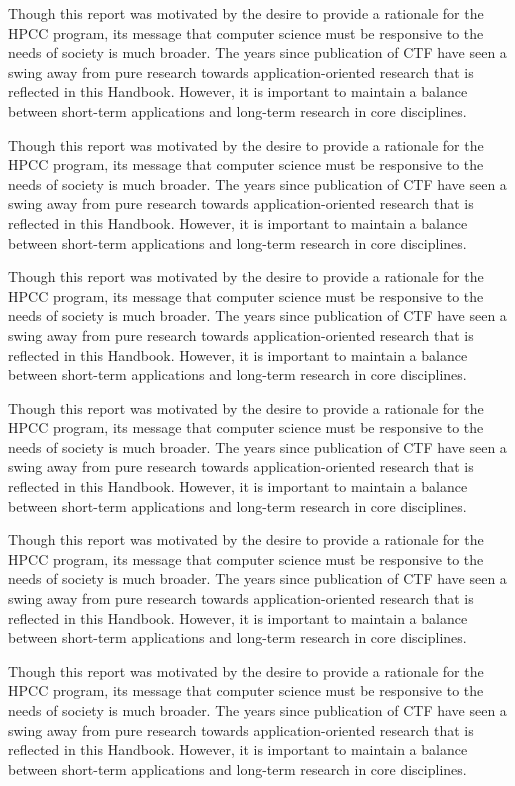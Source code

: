 Though this report was motivated by the desire to provide a
rationale for the HPCC program, its message that computer
science must be responsive to the needs of society is much
broader. The years since publication of CTF have seen a swing
away from pure research towards application-oriented research
that is reflected in this Handbook. However, it is important to
maintain a balance between short-term applications and long-term
research in core disciplines.

Though this report was motivated by the desire to provide a
rationale for the HPCC program, its message that computer
science must be responsive to the needs of society is much
broader. The years since publication of CTF have seen a swing
away from pure research towards application-oriented research
that is reflected in this Handbook. However, it is important to
maintain a balance between short-term applications and long-term
research in core disciplines.

Though this report was motivated by the desire to provide a
rationale for the HPCC program, its message that computer
science must be responsive to the needs of society is much
broader. The years since publication of CTF have seen a swing
away from pure research towards application-oriented research
that is reflected in this Handbook. However, it is important to
maintain a balance between short-term applications and long-term
research in core disciplines.

Though this report was motivated by the desire to provide a
rationale for the HPCC program, its message that computer
science must be responsive to the needs of society is much
broader. The years since publication of CTF have seen a swing
away from pure research towards application-oriented research
that is reflected in this Handbook. However, it is important to
maintain a balance between short-term applications and long-term
research in core disciplines.

Though this report was motivated by the desire to provide a
rationale for the HPCC program, its message that computer
science must be responsive to the needs of society is much
broader. The years since publication of CTF have seen a swing
away from pure research towards application-oriented research
that is reflected in this Handbook. However, it is important to
maintain a balance between short-term applications and long-term
research in core disciplines.

Though this report was motivated by the desire to provide a
rationale for the HPCC program, its message that computer
science must be responsive to the needs of society is much
broader. The years since publication of CTF have seen a swing
away from pure research towards application-oriented research
that is reflected in this Handbook. However, it is important to
maintain a balance between short-term applications and long-term
research in core disciplines.

